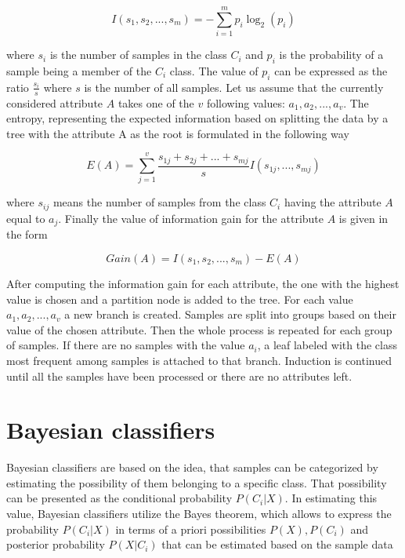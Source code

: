 \documentclass[11pt,oneside, a4paper]{report}
\begin{document}
\begin{equation} \label{eq:information-gain}
I(s_1, s_2, ..., s_m) = - \sum_{i=1}^{m} p_i \log_{2}(p_i)
\end{equation}

where $s_i$ is the number of samples in the class $C_i$ and $p_i$ is the probability of a sample being a member of the $C_i$ class. The value of $p_i$ can be expressed as the ratio $\frac{s_i}{s}$ where $s$ is the number of all samples.
Let us assume that the currently considered attribute $A$ takes one of the $v$ following values: ${a_1, a_2, ..., a_v}$. The entropy, representing the expected information based on splitting the data by a tree with the attribute A as the root is formulated in the following way

\begin{equation} \label{eq:entropy}
E(A) = \sum_{j=1}^{v} \frac{s_{1j} + s_{2j} + ... + s_{mj}}{s} I(s_{1j}, ..., s_{mj})
\end{equation}

where $s_{ij}$ means the number of samples from the class $C_i$ having the attribute $A$ equal to $a_j$.
Finally the value of information gain for the attribute $A$ is given in the form

\begin{equation} \label{eq:information-gain}
Gain(A) = I(s_1, s_2, ... , s_m) - E(A)
\end{equation}

After computing the information gain for each attribute, the one with the highest value is chosen and a partition node is added to the tree. For each value ${a_1, a_2, ..., a_v}$ a new branch is created. Samples are split into groups based on their value of the chosen attribute. Then the whole process is repeated for each group of samples. If there are no samples with the value $a_i$, a leaf labeled with the class most frequent among samples is attached to that branch. Induction is continued until all the samples have been processed or there are no attributes left.

\section{Bayesian classifiers}
Bayesian classifiers are based on the idea, that samples can be categorized by estimating the possibility of them belonging to a specific class. That possibility can be presented as the conditional probability $P(C_i|X)$. In estimating this value, Bayesian classifiers utilize the Bayes theorem, which allows to express the probability $P(C_i|X)$ in terms of a priori possibilities $P(X), P(C_i)$ and posterior probability $P(X|C_i)$ that can be estimated based on the sample data
\end{document}
